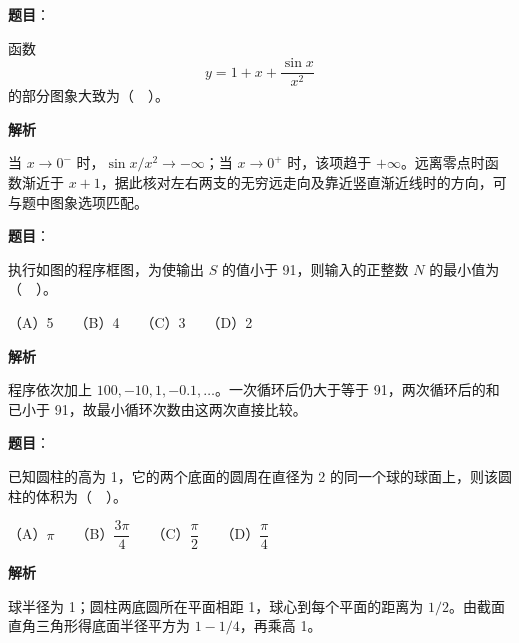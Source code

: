 \begin{answer}

\textbf{题目}：

函数
\nopagebreak[4]
\[
y=1+x+\frac{\sin x}{x^2}
\]
的部分图象大致为（　）。
\nopagebreak[4]
\begin{center}\end{center}
\nopagebreak[4]
\textbf{解析}

当 \(x\to0^-\) 时，\(\sin x/x^2\to-\infty\)；当 \(x\to0^+\) 时，该项趋于 \(+\infty\)。远离零点时函数渐近于 \(x+1\)，据此核对左右两支的无穷远走向及靠近竖直渐近线时的方向，可与题中图象选项匹配。


\end{answer}
\begin{answer}

\textbf{题目}：

执行如图的程序框图，为使输出 \(S\) 的值小于 91，则输入的正整数 \(N\) 的最小值为（　）。
\nopagebreak[4]
\begin{center}\end{center}
\nopagebreak[4]
（A）5　　（B）4　　（C）3　　（D）2

\textbf{解析}

程序依次加上 \(100,-10,1,-0.1,\ldots\)。一次循环后仍大于等于 91，两次循环后的和已小于 91，故最小循环次数由这两次直接比较。


\end{answer}
\begin{answer}

\textbf{题目}：

已知圆柱的高为 1，它的两个底面的圆周在直径为 2 的同一个球的球面上，则该圆柱的体积为（　）。

（A）\(\pi\)　　（B）\(\dfrac{3\pi}{4}\)　　（C）\(\dfrac{\pi}{2}\)　　（D）\(\dfrac{\pi}{4}\)

\textbf{解析}

球半径为 1；圆柱两底圆所在平面相距 1，球心到每个平面的距离为 \(1/2\)。由截面直角三角形得底面半径平方为 \(1-1/4\)，再乘高 1。


\end{answer}
